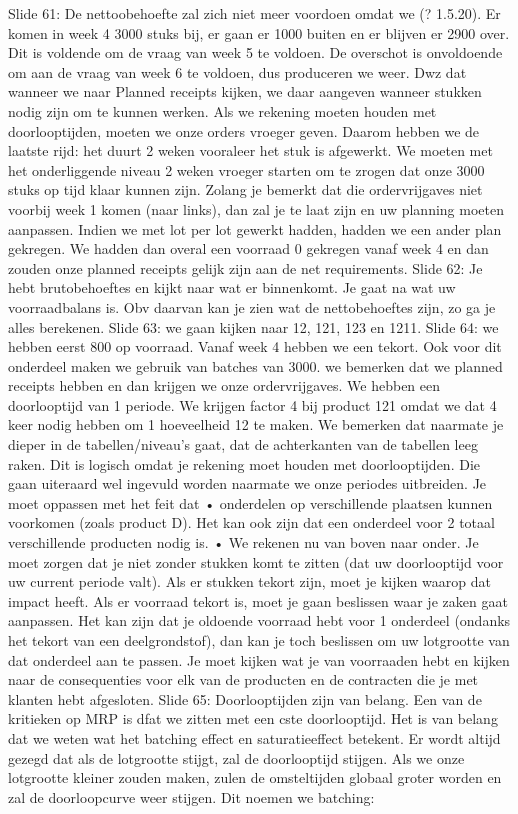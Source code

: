 \documentclass[10pt,a4paper]{report}
\begin{document}
Slide 61: De nettoobehoefte zal zich niet meer voordoen omdat we (? 1.5.20).
Er komen in week 4 3000 stuks bij, er gaan er 1000 buiten en er blijven er 2900 over. Dit is voldende om de vraag van week 5 te voldoen. De overschot is onvoldoende om aan de vraag van week 6 te voldoen, dus produceren we weer. Dwz dat wanneer we naar Planned receipts kijken, we daar aangeven wanneer stukken nodig zijn om te kunnen werken. Als we rekening moeten houden met doorlooptijden, moeten we onze orders vroeger geven. Daarom hebben we de laatste rijd: het duurt 2 weken vooraleer het stuk is afgewerkt. We moeten met het onderliggende niveau 2 weken vroeger starten om te zrogen dat onze 3000 stuks op tijd klaar kunnen zijn. Zolang je bemerkt dat die ordervrijgaves niet voorbij week 1 komen (naar links), dan zal je te laat zijn en uw planning moeten aanpassen. Indien we met lot per lot gewerkt hadden, hadden we een ander plan gekregen. We hadden dan overal een voorraad 0 gekregen vanaf week 4 en dan zouden onze planned receipts gelijk zijn aan de net requirements.
Slide 62: Je hebt brutobehoeftes en kijkt naar wat er binnenkomt. Je gaat na wat uw voorraadbalans is. Obv daarvan kan je zien wat de nettobehoeftes zijn, zo ga je alles berekenen.
Slide 63: we gaan kijken naar 12, 121, 123 en 1211.
Slide 64: we hebben eerst 800 op voorraad. Vanaf week 4 hebben we een tekort. Ook voor dit onderdeel maken we gebruik van batches van 3000. we bemerken dat we planned receipts hebben en dan krijgen we onze ordervrijgaves. We hebben een doorlooptijd van 1 periode. We krijgen factor 4 bij product 121 omdat we dat 4 keer nodig hebben om 1 hoeveelheid 12 te maken.
We bemerken dat naarmate je dieper in de tabellen/niveau's gaat, dat de achterkanten van de tabellen leeg raken. Dit is logisch omdat je rekening moet houden met doorlooptijden. Die gaan uiteraard wel ingevuld worden naarmate we onze periodes uitbreiden.
Je moet oppassen met het feit dat
	•  onderdelen op verschillende plaatsen kunnen voorkomen (zoals product D). Het kan ook zijn dat een onderdeel voor 2 totaal verschillende producten nodig is. 
	• We rekenen nu van boven naar onder. Je moet zorgen dat je niet zonder stukken komt te zitten (dat uw doorlooptijd voor uw current periode valt). Als er stukken tekort zijn, moet je kijken waarop dat impact heeft. Als er voorraad tekort is, moet je gaan beslissen waar je zaken gaat aanpassen. Het kan zijn dat je oldoende voorraad hebt voor 1 onderdeel (ondanks het tekort van een deelgrondstof), dan kan je toch beslissen om uw lotgrootte van dat onderdeel aan te passen. Je moet kijken wat je van voorraaden hebt en kijken naar de consequenties voor elk van de producten en de contracten die je met klanten hebt afgesloten. 
Slide 65: Doorlooptijden zijn van belang. Een van de kritieken op MRP is dfat we zitten met een cste doorlooptijd. Het is van belang dat we weten wat het batching effect en saturatieeffect betekent. Er wordt altijd gezegd dat als  de lotgrootte stijgt, zal de doorlooptijd stijgen. Als we onze lotgrootte kleiner zouden maken, zulen de omsteltijden globaal groter worden en zal de doorloopcurve weer stijgen. Dit noemen we batching:
\end{document}

